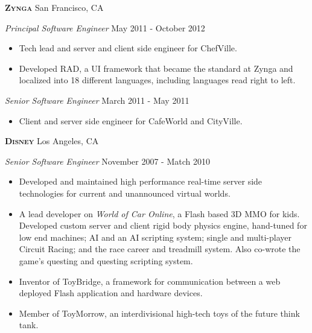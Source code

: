 \documentclass[a4paper]{article}
\begin{document}
\textbf{\textsc{Zynga}} \hfill San Francisco, CA\\
\vspace{2mm}

\begin{addmargin}[1em]{0em}

\textit{Principal Software Engineer} \hfill May 2011 - October 2012\\
\vspace{-1mm}
\begin{itemize} \itemsep 1pt
    \item Tech lead and server and client side engineer for ChefVille.
    \item Developed RAD, a UI framework that became the standard at Zynga and localized
    into 18 different languages, including languages read right to left.
\end{itemize}
\textit{Senior Software Engineer} \hfill March 2011 - May 2011\\
\vspace{-1mm}
\begin{itemize} \itemsep 1pt
    \item Client and server side engineer for CafeWorld and CityVille.
\end{itemize}
\end{addmargin}

\textbf{\textsc{Disney}} \hfill Los Angeles, CA\\
\vspace{2mm}

\begin{addmargin}[1em]{0em}

\textit{Senior Software Engineer} \hfill November 2007 - Match 2010\\
\vspace{-1mm}
\begin{itemize} \itemsep 1pt
    \item Developed and maintained high performance real-time server side
        technologies for current and unannounced virtual worlds.
    \item A lead developer on \textit{World of Car Online}, a Flash based 3D MMO for kids.
        Developed custom server and client rigid body physics engine, hand-tuned for low 
        end machines; AI and an AI scripting system; single and multi-player Circuit Racing;
        and the race career and treadmill system. Also co-wrote the game's questing and 
        questing scripting system.
    \item Inventor of ToyBridge, a framework for communication between a web 
        deployed Flash application and hardware devices.
    \item Member of ToyMorrow, an interdivisional high-tech toys of the future think 
        tank.
\end{itemize}

\end{addmargin}
\end{document}
